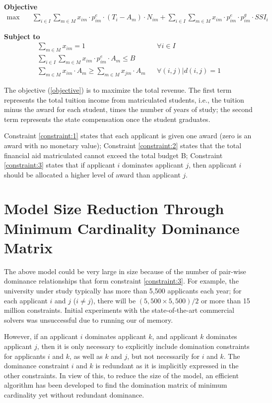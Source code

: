 \documentclass[12pt,english]{report}
\begin{document}
\hspace{-0.5cm}\textbf{Objective}
\begin{align}
\max \quad
& \sum_{i\in I} \sum_{m\in M} x_{im}\cdot p^e_{im}\cdot(T_i-A_m)\cdot N_{im}+
\sum_{i\in I} \sum_{m\in M} x_{im}\cdot p^e_{im} \cdot p^g_{im}\cdot SSI_i  \label{objective}
\end{align}

\hspace{-0.55cm}\textbf{Subject to}
\begin{align}
\sum_{m \in M}x_{im}=1 &&	\forall i\in I \label{constraint:1}  \\
\sum_{i \in I} \sum_{m\in M} x_{im}\cdot p^e_{im}\cdot A_m\leq B \label{constraint:2}  \\
\sum_{m \in M} x_{im}\cdot A_m \geq \sum_{m \in M} x_{jm}\cdot A_m && \forall (i,j)|d(i,j)=1 \label{constraint:3} 
\end{align}

The objective (\ref{objective}) is to maximize the total revenue. The first term represents the total tuition income from matriculated students, i.e., the tuition minus the award for each student, times the number of years of study; the second term represents the state compensation once the student graduates.

Constraint \ref{constraint:1}  states that each applicant is given one award (zero is an award with no monetary value); Constraint \ref{constraint:2}  states that the total financial aid matriculated  cannot exceed the total budget B; Constraint  \ref{constraint:3} states that if applicant $i$ dominates applicant $j$, then applicant $i$ should be allocated a higher level of award than applicant $j$. 

\section{ Model Size Reduction Through Minimum Cardinality Dominance Matrix}

\noindent The above model could be very large in size because of the number of pair-wise dominance relationships that form constraint \ref{constraint:3}. For example, the university under study typically has more than 5,500 applicants each year; for each applicant $i$ and $j$ ($i \neq j$), there will be $(5,500 \times 5,500) / 2$ or more than 15 million constraints. Initial experiments with the state-of-the-art commercial solvers was unsuccessful due to running our of memory. 

However, if an applicant $i$ dominates applicant $k$, and applicant $k$ dominates applicant $j$, then it is only necessary to explicitly include domination constraints for applicants $i$ and $k$, as well as $k$ and $j$, but not necessarily for $i$ and $k$. The dominance constraint $i$ and $k$ is redundant as it is implicitly expressed in the other constraints.  In view of this, to reduce the size of the model, an efficient algorithm has been developed to find the domination matrix of minimum cardinality yet without redundant dominance. 
\end{document}
